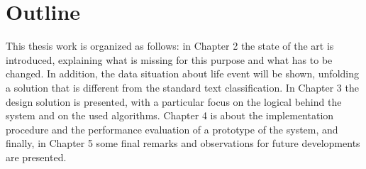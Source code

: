 \section{Outline}

This thesis work is organized as follows: in Chapter 2 the state of the art is introduced, explaining what is missing for this purpose and what has to be changed. In addition, the data situation about life event will be shown, unfolding a solution that is different from the standard text classification. In Chapter 3 the design solution is presented, with a particular focus on the logical behind the system and on the used algorithms. Chapter 4 is about the implementation procedure and the performance evaluation of a prototype of the system, and finally, in Chapter 5 some final remarks and observations for future developments are presented.

